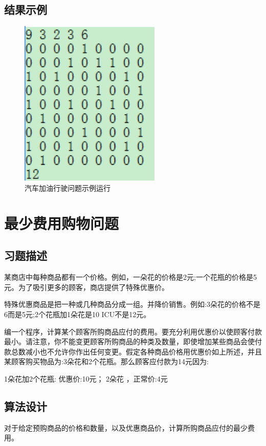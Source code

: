 \documentclass[UTF8]{ctexart}
\begin{document}
    \subsection{结果示例}
    \begin{figure}[!htb]
      \centering
      \includegraphics[width=0.6\textwidth]{../img/1.PNG}
      \caption{汽车加油行驶问题示例运行}\label{汽车加油行驶问题示例运行}
    \end{figure}

    \section{最少费用购物问题}
    \subsection{习题描述}
    某商店中每种商品都有一个价格。例如，一朵花的价格是2元;一个花瓶的价格是5元。为了吸引更多的顾客，商店提供了特殊优惠价。

    特殊优惠商品是把一种或几种商品分成一组。并降价销售。例如:3朵花的价格不是6而是5元;2个花瓶加1朵花是10 ICU不是12元。

    编一个程序，计算某个顾客所购商品应付的费用。要充分利用优惠价以使顾客付款最小。请注意，你不能变更顾客所购商品的种类及数量，即使增加某些商品会使付款总数减小也不允许你作出任何变更。假定各种商品价格用优惠价如上所述，并且某顾客购买物品为:3朵花和2个花瓶。那么顾客应付款为14元因为:

    1朵花加2个花瓶: 优惠价:10元； 2朵花  ，正常价:4元

    \subsection{算法设计}
    对于给定预购商品的价格和数量，以及优惠商品价，计算所购商品应付的最少费用。
\end{document}
